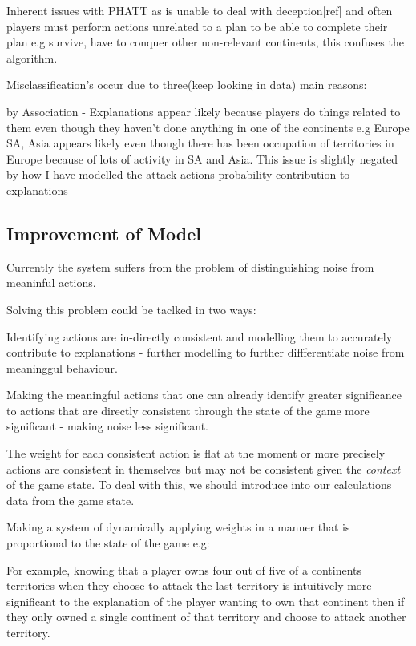 \documentclass[parskip]{cs4rep}
\begin{document}
Inherent issues with PHATT as is unable to deal with deception[ref] and often players must perform actions unrelated to a plan to be able to complete their plan e.g survive, have to conquer other non-relevant continents, this confuses the algorithm.

Misclassification's occur due to three(keep looking in data) main reasons:

by Association - Explanations appear likely because players do things related to them even though they haven't done anything in one of the continents e.g Europe SA, Asia appears likely even though there has been occupation of territories in Europe because of lots of activity in SA and Asia. This issue is slightly negated by how I have modelled the attack actions probability contribution to explanations

\subsection{Improvement of Model}

Currently the system suffers from the problem of distinguishing noise from meaninful actions.

Solving this problem could be taclked in two ways:

Identifying actions are in-directly consistent and modelling them to accurately contribute to explanations - further modelling to further diffferentiate noise from meaninggul behaviour.
 
Making the meaningful actions that one can already identify greater significance to actions that are directly consistent through the state of the game  more significant - making noise less significant.

The weight for each consistent action is flat at the moment or more precisely actions are consistent in themselves but may not be consistent given the \textit{context} of the game state. To deal with this, we should introduce into our calculations data from the game state.

Making a system of dynamically applying weights in a manner that is proportional to the state of the game e.g:

For example, knowing that a player owns four out of five of a continents territories when they choose to attack the last territory is intuitively more significant to the explanation of the player wanting to own that continent then if they only owned a single continent of that territory and choose to attack another territory.
\end{document}
